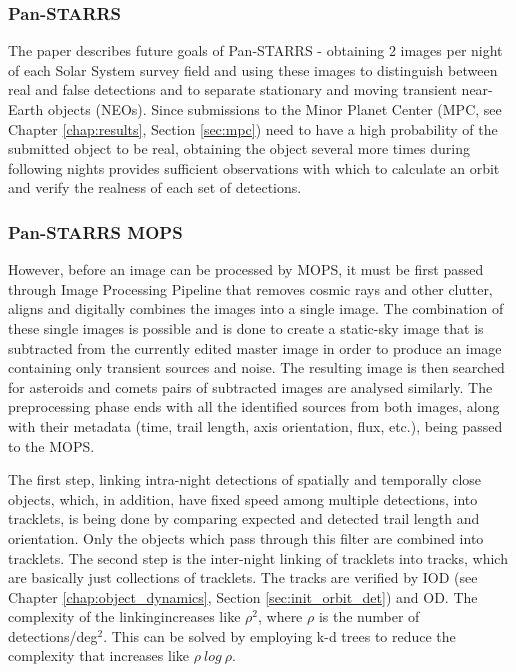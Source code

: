 \subsubsection{Pan-STARRS}
	
	The paper describes future goals of Pan-STARRS - obtaining 2 images per night of each Solar System survey field and using these images to distinguish between real and false detections and to separate stationary and moving transient near-Earth objects (NEOs). Since submissions to the Minor Planet Center (MPC, see Chapter \ref{chap:results}, Section \ref{sec:mpc}) need to have a high probability of the submitted object to be real, obtaining the object several more times during following nights provides sufficient observations with which to calculate an orbit and verify the realness of each set of detections.
	
\subsubsection{Pan-STARRS MOPS}
	
	However, before an image can be processed by MOPS, it must be first passed through Image Processing Pipeline that removes cosmic rays and other clutter, aligns and digitally combines the images into a single image. The combination of these single images is possible and is done to create a static-sky image that is subtracted from the currently edited master image in order to produce an image containing only transient sources and noise. The resulting image is then searched for asteroids and comets\; pairs of subtracted images are analysed similarly. The preprocessing phase ends with all the identified sources from both images, along with their metadata (time, trail length, axis orientation, flux, etc.), being passed to the MOPS.
	
	The first step, linking intra-night detections of spatially and temporally close objects, which, in addition, have fixed speed among multiple detections, into tracklets, is being done by comparing expected and detected trail length and orientation. Only the objects which pass through this filter are combined into tracklets. The second step is the inter-night linking of tracklets into tracks, which are basically just collections of tracklets. The tracks are verified by IOD (see Chapter \ref{chap:object_dynamics}, Section \ref{sec:init_orbit_det}) and OD. The complexity of the linkingincreases like $\rho^2$, where $\rho$ is the number of detections/deg$^2$. This can be solved by employing k-d trees to reduce the complexity that increases like $\rho\ log\ \rho$.
	
